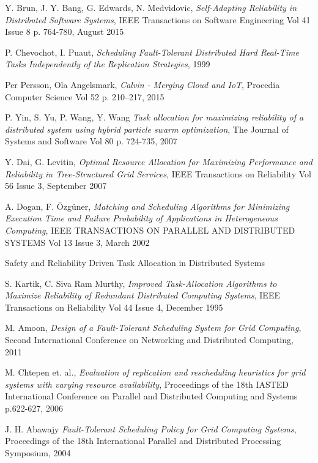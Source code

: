 \documentclass{cslthse-msc}
\begin{document}
\begin{thebibliography}{50}
	Y. Brun, J. Y. Bang, G. Edwards, N. Medvidovic,
	\emph{Self-Adapting Reliability in Distributed Software Systems},
	IEEE Transactions on Software Engineering Vol 41 			Issue 8 p. 764-780,
	August 2015

	P. Chevochot, I. Puaut,
	\emph{Scheduling Fault-Tolerant Distributed Hard Real-Time Tasks Independently of the Replication Strategies},
	1999

	Per Persson, Ola Angelsmark,
	\emph{Calvin - Merging Cloud and IoT},
	Procedia Computer Science Vol 52 p. 210–217,
	2015

	P. Yin, S. Yu, P. Wang, Y. Wang
	\emph{Task allocation for maximizing reliability of a distributed system using hybrid particle swarm optimization},
	The Journal of Systems and Software Vol 80 p. 724-735,
	2007

	Y. Dai, G. Levitin,
	\emph{Optimal Resource Allocation for Maximizing Performance and Reliability in Tree-Structured Grid Services},
	IEEE Transactions on Reliability Vol 56 Issue 3,
	September 2007

	A. Dogan, F. Özgüner,
	\emph{Matching and Scheduling Algorithms for Minimizing Execution Time and Failure Probability of Applications in Heterogeneous Computing},
	IEEE TRANSACTIONS ON PARALLEL AND DISTRIBUTED 	SYSTEMS Vol 13 Issue 3,
	March 2002

Safety and Reliability Driven Task Allocation in Distributed Systems

	S. Kartik, C. Siva Ram Murthy,
	\emph{Improved Task-Allocation Algorithms to Maximize Reliability of Redundant Distributed Computing Systems},
IEEE Transactions on Reliability Vol 44 Issue 4,
	December 1995

	M. Amoon,
	\emph{Design of a Fault-Tolerant Scheduling System for Grid Computing},
	Second International Conference on Networking and Distributed Computing,
	2011

	M. Chtepen et. al.,
	\emph{Evaluation of replication and rescheduling heuristics for grid systems with varying resource availability},
Proceedings of the 18th IASTED International Conference on Parallel and Distributed Computing and Systems p.622-627,
	2006

	J. H. Abawajy
	\emph{Fault-Tolerant Scheduling Policy for Grid Computing Systems},
	Proceedings of the 18th International Parallel and Distributed Processing Symposium,
	2004


\end{thebibliography}
\end{document}
